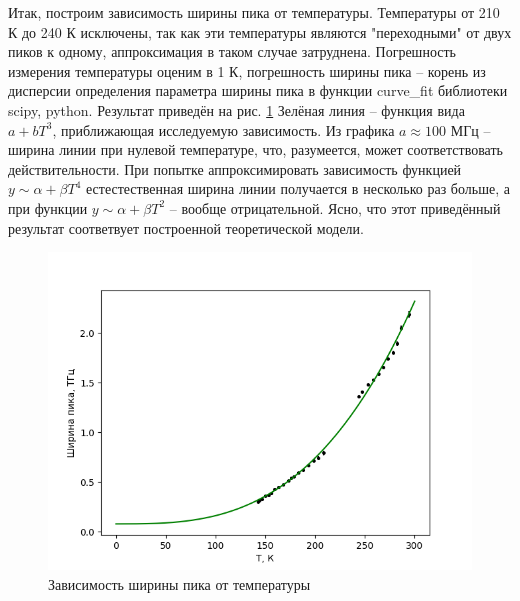 Итак, построим зависимость ширины пика от температуры. Температуры от 210 К до 240 К 
исключены, так как эти температуры являются "переходными" от двух пиков к одному,
аппроксимация в таком случае затруднена. Погрешность измерения температуры оценим в
1 К, погрешность ширины пика -- корень из дисперсии определения параметра ширины пика 
в функции curve\_fit библиотеки scipy, python. Результат приведён на рис. \ref{peak_width}
Зелёная линия -- функция вида $a + bT^3$, приближающая исследуемую зависимость. 
Из графика $a \approx 100 \text{ МГц}$ -- ширина линии при нулевой температуре, что, разумеется,
может соответствовать действительности. При попытке аппроксимировать зависимость
функцией $y \sim \alpha + \beta T^4$ естестественная ширина линии получается в несколько
раз больше, а при функции $y \sim \alpha + \beta T^2$ -- вообще отрицательной. 
Ясно, что этот приведённый результат соответвует построенной теоретической модели. 



\begin{figure}[!h]
    \begin{center}
        \includegraphics[width=0.9 \linewidth]{peak_width.png}
        \caption{Зависимость ширины пика от температуры}
        \label{peak_width}
    \end{center}
\end{figure}


